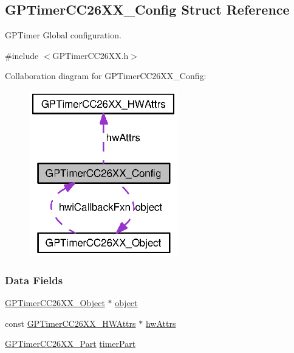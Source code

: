 \subsection{G\+P\+Timer\+C\+C26\+X\+X\+\_\+\+Config Struct Reference}
\label{struct_g_p_timer_c_c26_x_x___config}


G\+P\+Timer Global configuration.  




{\ttfamily \#include $<$G\+P\+Timer\+C\+C26\+X\+X.\+h$>$}



Collaboration diagram for G\+P\+Timer\+C\+C26\+X\+X\+\_\+\+Config\+:
\nopagebreak
\begin{figure}[H]
\begin{center}
\leavevmode
\includegraphics[width=183pt]{struct_g_p_timer_c_c26_x_x___config__coll__graph}
\end{center}
\end{figure}
\subsubsection*{Data Fields}
\begin{DoxyCompactItemize}
\item 
\hyperlink{struct_g_p_timer_c_c26_x_x___object}{G\+P\+Timer\+C\+C26\+X\+X\+\_\+\+Object} $\ast$ \hyperlink{struct_g_p_timer_c_c26_x_x___config_a92658b3b494f165b96a8bb7324ffb737}{object}
\item 
const \hyperlink{struct_g_p_timer_c_c26_x_x___h_w_attrs}{G\+P\+Timer\+C\+C26\+X\+X\+\_\+\+H\+W\+Attrs} $\ast$ \hyperlink{struct_g_p_timer_c_c26_x_x___config_a713a6a23b178957ab2f245326f954b2b}{hw\+Attrs}
\item 
\hyperlink{_g_p_timer_c_c26_x_x_8h_aff5462fa33c306f2c8bd29284fd898b0}{G\+P\+Timer\+C\+C26\+X\+X\+\_\+\+Part} \hyperlink{struct_g_p_timer_c_c26_x_x___config_a6d76dc1cbe8a2e7e38a2c6546ea58782}{timer\+Part}
\end{DoxyCompactItemize}


